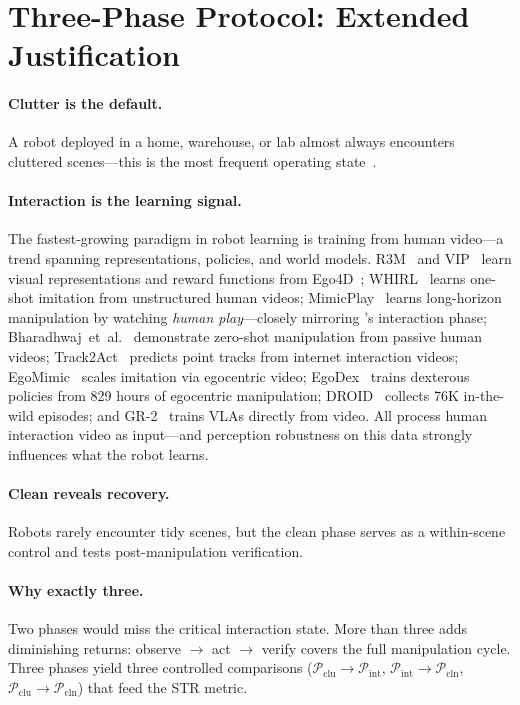 \section{Three-Phase Protocol: Extended Justification}
\label{sec:appendix-phases}

\paragraph{Clutter is the default.}
A robot deployed in a home, warehouse, or lab almost always encounters cluttered scenes---this is the most frequent operating state~\citep{liu2024okrobot, khazatsky2024droid}.

\paragraph{Interaction is the learning signal.}
The fastest-growing paradigm in robot learning is training from human video---a trend spanning representations, policies, and world models.
R3M~\citep{nair2022r3m} and VIP~\citep{ma2023vip} learn visual representations and reward functions from Ego4D~\citep{grauman2022ego4d};
WHIRL~\citep{bahl2022whirl} learns one-shot imitation from unstructured human videos;
MimicPlay~\citep{wang2023mimicplay} learns long-horizon manipulation by watching \textit{human play}---closely mirroring \coolname{}'s interaction phase;
Bharadhwaj~et~al.~\citep{bharadhwaj2023zeroshothuman} demonstrate zero-shot manipulation from passive human videos;
Track2Act~\citep{bharadhwaj2024track2act} predicts point tracks from internet interaction videos;
EgoMimic~\citep{kareer2024egomimic} scales imitation via egocentric video;
EgoDex~\citep{shaw2025egodex} trains dexterous policies from 829 hours of egocentric manipulation;
DROID~\citep{khazatsky2024droid} collects 76K in-the-wild episodes;
and GR-2~\citep{cheang2024gr2} trains VLAs directly from video.
All process human interaction video as input---and perception robustness on this data strongly influences what the robot learns.

\paragraph{Clean reveals recovery.}
Robots rarely encounter tidy scenes, but the clean phase serves as a within-scene control and tests post-manipulation verification.

\paragraph{Why exactly three.}
Two phases would miss the critical interaction state. More than three adds diminishing returns: observe $\to$ act $\to$ verify covers the full manipulation cycle.
Three phases yield three controlled comparisons ($\mathcal{P}_{\text{clu}} \!\to\! \mathcal{P}_{\text{int}}$, $\mathcal{P}_{\text{int}} \!\to\! \mathcal{P}_{\text{cln}}$, $\mathcal{P}_{\text{clu}} \!\to\! \mathcal{P}_{\text{cln}}$) that feed the STR metric.

